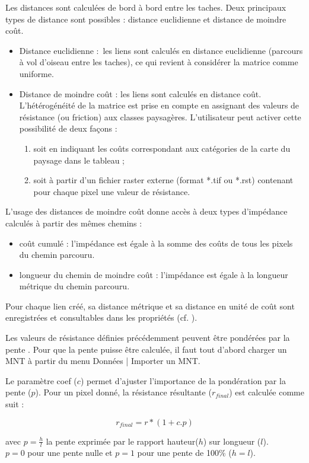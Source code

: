 \documentclass{article}
\begin{document}
Les distances sont calculées de bord à bord entre les taches. Deux principaux types de distance sont possibles : distance euclidienne et distance de moindre coût.
\begin{itemize}
	\item Distance euclidienne :~les liens sont calculés en distance euclidienne (parcours à vol d’oiseau entre les taches), ce qui revient à considérer la matrice comme uniforme.
	\item Distance de moindre coût : les liens sont calculés en distance coût. L’hétérogénéité de la matrice est prise en compte en assignant des valeurs de résistance (ou friction) aux classes paysagères. L’utilisateur peut activer cette possibilité de deux façons :
	\begin{enumerate}
		\item soit en indiquant les coûts correspondant aux catégories de la carte du paysage dans le tableau ;
		\item soit à partir d’un fichier raster externe (format *.tif ou *.rst) contenant pour chaque pixel une valeur de résistance.
	\end{enumerate}
\end{itemize}

L’usage des distances de moindre coût donne accès à deux types d’impédance calculés à partir des mêmes chemins :
\begin{itemize}
	\item coût cumulé : l’impédance est égale à la somme des coûts de tous les pixels du chemin parcouru.
	\item longueur du chemin de moindre coût : l’impédance est égale à la longueur métrique du chemin parcouru.
\end{itemize}

Pour chaque lien créé, sa distance métrique et sa distance en unité de coût sont enregistrées et consultables dans les propriétés (cf. ).

Les valeurs de résistance définies précédemment peuvent être pondérées par la pente \cite{2015_monkey}. Pour que la pente puisse être calculée, il faut tout d'abord charger un MNT à partir du menu Données | Importer un MNT. 

Le paramètre coef ($c$) permet d'ajuster l'importance de la pondération par la pente ($p$). Pour un pixel donné, la résistance résultante ($r_{final}$) est calculée comme suit :

$$r_{final} = r * (1 + c.p)$$

avec $p=\frac{h}{l}$ la pente exprimée par le rapport hauteur($h$) sur longueur ($l$).\\ $p=0$ pour une pente nulle et $p=1$ pour une pente de 100\% ($h=l$).
\end{document}
